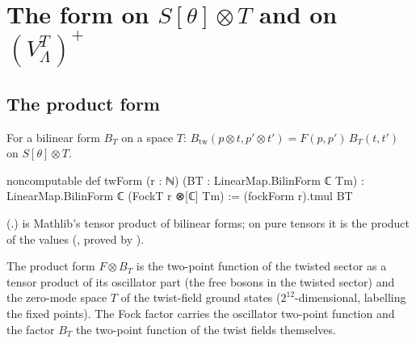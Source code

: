 \section{The form on \texorpdfstring{$S[\theta]\otimes T$}{S[theta] x T} and on \texorpdfstring{$(V_\Lambda^T)^+$}{the twisted plus part}}\label{ch09:sec:twform}

\subsection{The product form}

\begin{definition}\label{ch09:def:twForm}
For a bilinear form $B_T$ on a space $T$:
$B_{\mathrm{tw}}(p\otimes t,p'\otimes t')=F(p,p')\,B_T(t,t')$ on $S[\theta]\otimes T$.
\end{definition}
\begin{leancode}
noncomputable def twForm (r : ℕ) (BT : LinearMap.BilinForm ℂ Tm) :
    LinearMap.BilinForm ℂ (FockT r ⊗[ℂ] Tm) :=
  (fockForm r).tmul BT
\end{leancode}
(.)  is Mathlib's
tensor product of bilinear forms; on pure tensors it is the product of the values
(, proved by ).

\begin{physics}
The product form $F\otimes B_T$ is the two-point function of the twisted sector as a tensor product of its oscillator part (the free bosons in the twisted sector) and the zero-mode space $T$ of the twist-field ground states ($2^{12}$-dimensional, labelling the fixed points). The Fock factor carries the oscillator two-point function and the factor $B_T$ the two-point function of the twist fields themselves.
\end{physics}

